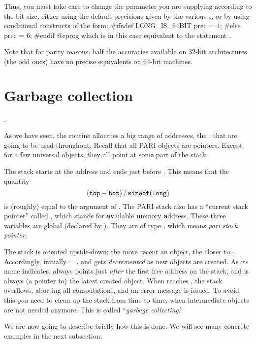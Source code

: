 Thus, you must take care to change the  parameter you are supplying
according to the bit size, either using the default precisions given by the
various s, or by using conditional constructs of the form:
%
\bprog
#ifndef LONG_IS_64BIT
  prec = 4;
#else
  prec = 6;
#endif
@eprog
\noindent which is in this case equivalent to the statement
.

Note that for parity reasons, half the accuracies available on 32-bit
architectures (the odd ones) have no precise equivalents on 64-bit machines.

\section{Garbage collection}\label{se:garbage}

.

\noindent
As we have seen, the  routine allocates a big range of
addresses, the , that are going to be used throughout. Recall
that all PARI objects are pointers. Except for a few universal objects,
they all point at some part of the stack.

The stack starts at the address  and ends just before . This
means that the quantity
%
$$ ({\tt top} - {\tt bot})\,/\,{\tt sizeof(long)} $$
%
is (roughly) equal to the  argument of . The PARI
stack also has a ``current stack pointer'' called , which stands
for {\bf av}ailable {\bf m}emory {\bf a}ddress. These three variables are
global (declared by ). They are of type , which
means \emph{pari stack pointer}.

The stack is oriented upside-down: the more recent an object, the closer to
. Accordingly, initially  = , and  gets
\emph{decremented} as new objects are created. As its name indicates,
 always points just \emph{after} the first free address on the
stack, and  is always (a pointer to) the latest created object.
When  reaches , the stack overflows, aborting all
computations, and an error message is issued. To avoid this \emph{you}
need to clean up the stack from time to time, when intermediate objects are
not needed anymore. This is called ``\emph{garbage collecting}.''

We are now going to describe briefly how this is done. We will see many
concrete examples in the next subsection.

